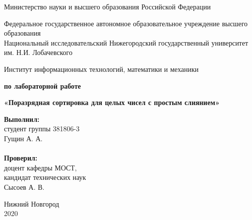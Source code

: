 \documentclass{report}
\begin{document}
	
	\begin{titlepage}
		
		\begin{center}
			Министерство науки и высшего образования Российской Федерации
		\end{center}
		
		\begin{center}
			Федеральное государственное автономное образовательное учреждение высшего образования \\
			Национальный исследовательский Нижегородский государственный университет им. Н.И. Лобачевского
		\end{center}
		
		\begin{center}
			Институт информационных технологий, математики и механики
		\end{center}
		
		\vspace{4em}
		
		\begin{center}
			\textbf{ по лабораторной работе} \\
		\end{center}
		\begin{center}
			\textbf{\Large«Поразрядная сортировка для целых чисел с простым слиянием»} \\
		\end{center}
		
		\vspace{4em}
		
		\newbox{\lbox}
		\newlength{\maxl}
		\setlength{\maxl}{\wd\lbox}
		\hfill\parbox{7cm}{
			\hspace*{5cm}\hspace*{-5cm}\textbf{Выполнил:} \\ студент группы 381806-3 \\ Гущин А. А.\\
			\\
			\hspace*{5cm}\hspace*{-5cm}\textbf{Проверил:}\\ доцент кафедры МОСТ, \\ кандидат технических наук \\ Сысоев А. В.\\
		}
		\vspace{\fill}
		
		\begin{center} Нижний Новгород \\ 2020 \end{center}
		
	\end{titlepage}
	
\end{document}
